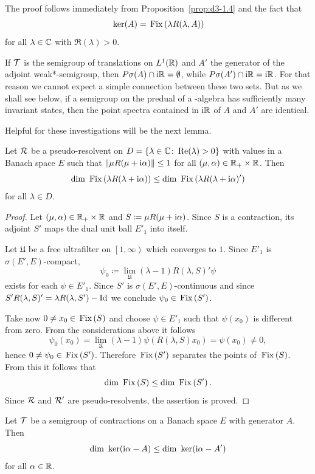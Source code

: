 The proof follows immediately from Proposition~\ref{prop:d3-1.4} and the fact that 
\[ 
\mathop{}\mathrm{ker}(A) = \mathop{}\mathrm{Fix}\left(\lambda R(\lambda,A)\right)
\]
for all $\lambda \in \mathbb{C}$ with $\Re(\lambda) > 0$.

If\/ $\mathcal{T}$ is the semigroup of translations on $L^1(\mathbb{R})$ and $A'$ the generator 
of the adjoint weak*-semigroup, then $P\sigma(A) \cap \mathrm{i}\mathbb{R} = \emptyset$, while $P{\sigma}(A') \cap \mathrm{i}\mathbb{R} = \mathrm{i}\mathbb{R}$.
For that reason we cannot expect a simple connection between these two sets.
But as we shall see below, if a semigroup on the predual of a \WA-algebra has sufficiently many invariant states, then the point spectra contained in $\mathrm{i}\mathbb{R}$ of\/ $A$ and $A'$  are identical.

Helpful for these investigations will be the next lemma.
\begin{lemma}\label{lem:d3-1.6}
Let $\mathcal{R}$ be a pseudo-resolvent on $D = \{\lambda \in \mathbb{C} \colon \mathop{}\!\mathrm{Re}(\lambda) > 0\}$ with values in a Banach space $E$ such that $\|\mu R(\mu + \im\alpha)\| \leq 1$ for all $(\mu,\alpha) \in \mathbb{R}_{+} \times \mathbb{R}$.
Then
\[
\dim \Fix{\lambda R(\lambda + \im\alpha)} \leq \dim \Fix{\lambda R(\lambda + \im\alpha)'} 
\]
for all $\lambda \in D$.
\end{lemma}
\begin{proof}
Let $(\mu,\alpha) \in \mathbb{R}_{+} \times \mathbb{R}$ and $S \coloneq \mu R(\mu + \mathrm{i}\alpha)$.
Since $S$ is a contraction, its adjoint $S'$ maps the dual unit ball $E'_{1}$ into itself.

Let $\mathfrak{U}$ be a free ultrafilter on $ \left[1,\infty \right)$ which converges to $1$.
Since $E'_{1}$ is $\sigma(E',E)$-compact, 
\[
\psi_{0} \coloneq \lim_{\mathfrak{U}}(\lambda - 1)R(\lambda,S)'\psi
\]
exists for each $\psi \in E'_{1}$.
Since $S'$ is $\sigma(E',E)$-continuous and since $S'R(\lambda,S)' = \lambda R(\lambda,S')-\operatorname{Id}$ we conclude $\psi_{0} \in \mathop{}\mathrm{Fix}\left(S'\right)$.

Take now $0 \neq x_{0} \in \mathop{}\mathrm{Fix}\left(S\right)$ and choose $\psi \in E'_{1}$ such that $\psi(x_{0})$ is different from zero.
From the considerations above it follows
\[ 
\psi_{0}(x_{0}) = \lim_{\mathfrak{U}}(\lambda - 1)\psi(R(\lambda,S)x_{0}) = \psi(x_{0}) \neq 0 ,
\]
hence $0 \neq \psi_{0} \in \mathop{}\mathrm{Fix}\left(S'\right)$.
Therefore $\mathop{}\mathrm{Fix}\left(S'\right)$ separates the points of\/ $\mathop{}\mathrm{Fix}\left(S\right)$.
From this it follows that
\[
	\dim \Fix{S} \leq \dim \Fix{S'} .
\]
Since $\mathcal{R}$ and $\mathcal{R}'$ are pseudo-resolvents, the assertion is proved.
\end{proof}
\begin{corollary}\label{cor:d3-1.7}
Let $\mathcal{T}$ be a semigroup of contractions on a Banach space $E$ with generator $A$.
Then
\[
\dim \Kern{\im\alpha - A} \leq \dim \Kern{\im\alpha - A'}
\]
for all $\alpha \in \mathbb{R}$.
\end{corollary}
